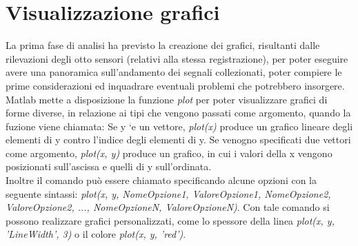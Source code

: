 \documentclass[a4paper, oneside]{book}
\begin{document}
\section{Visualizzazione grafici}
La prima fase di analisi ha previsto la creazione dei grafici, risultanti dalle rilevazioni degli otto sensori (relativi alla stessa registrazione), per poter eseguire avere una panoramica sull'andamento dei segnali collezionati, poter compiere le prime considerazioni ed inquadrare eventuali problemi che potrebbero insorgere.\\
Matlab mette a disposizione la funzione \textit{plot} per poter visualizzare grafici di forme diverse, in relazione ai tipi che vengono passati come argomento, quando la fuzione viene chiamata:  Se y `e un vettore, \textit{plot(x)} produce un grafico lineare degli elementi di y contro l’indice degli elementi di y.  Se venogno specificati due vettori come argomento,\textit{ plot(x, y) } produce un grafico, in cui i valori della x vengono posizionati sull'ascissa e quelli di y sull'ordinata. \\
Inoltre il comando può essere chiamato specificando alcune opzioni con la seguente sintassi: \textit{plot(x, y, NomeOpzione1, ValoreOpzione1, NomeOpzione2, ValoreOpzione2, ..., NomeOpzioneN, ValoreOpzioneN)}. Con tale comando si possono realizzare grafici personalizzati, come lo spessore della linea \textit{plot(x, y, 'LineWidth', 3)} o il colore \textit{plot(x, y, 'red')}.

\clearpage

\end{document}
